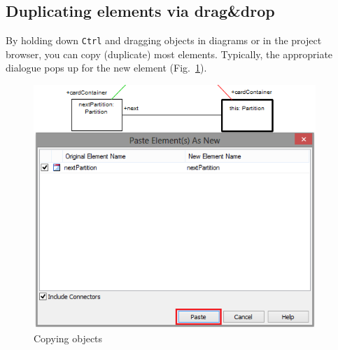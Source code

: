 \subsection{Duplicating elements via drag\&drop}

By holding down \texttt{Ctrl} and dragging objects in diagrams or in the project browser, you can copy (duplicate) most elements.
Typically, the appropriate dialogue pops up for the new element (Fig.~\ref{fig_copy01}).

\begin{figure}[htbp]
\begin{center}
  \includegraphics[width=0.95\textwidth]{copy1}
  \caption{Copying objects}  
  \label{fig_copy01}
\end{center}
\end{figure}